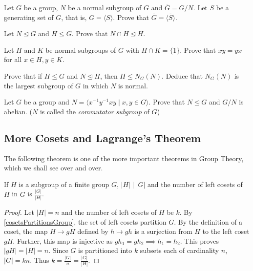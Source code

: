 \begin{exercise}
    Let $G$ be a group, $N$ be a normal subgroup of $G$ and $\overline G=G/N$. Let $S$ be a generating set of $G$, that is, $G=\langle S\rangle$. Prove that $\overline G=\langle\overline S\rangle$.
\end{exercise}

\begin{exercise}
    Let $N\unlhd G$ and $H\leq G$. Prove that $N\cap H\unlhd H$.
\end{exercise}

\begin{exercise}
    Let $H$ and $K$ be normal subgroups of $G$ with $H\cap K=\{1\}$. Prove that $xy=yx$ for all $x\in H, y\in K$.
\end{exercise}

\begin{exercise}
    Prove that if $H\leq G$ and $N\unlhd H$, then $H\leq N_G(N)$. Deduce that $N_G(N)$ is the largest subgroup of $G$ in which $N$ is normal.
\end{exercise}

\begin{exercise}
    Let $G$ be a group and $N=\langle x^{-1}y^{-1}xy\mid x,y\in G\rangle$. Prove that $N\unlhd G$ and $G/N$ is abelian. ($N$ is called the \textit{commutator subgroup} of $G$)
\end{exercise}

\subsection{More Cosets and Lagrange's Theorem}

The following theorem is one of the more important theorems in Group Theory, which we shall see over and over.

\begin{theorem}
\label{LagrangesTheorem}
    If $H$ is a subgroup of a finite group $G$, $|H|\mid |G|$ and the number of left cosets of $H$ in $G$ is $\frac{|G|}{|H|}$.
\end{theorem}
\begin{proof}
    Let $|H|=n$ and the number of left cosets of $H$ be $k$. By \ref{cosetsPartitionsGroup}, the set of left cosets partition $G$. By the definition of a coset, the map $H\to gH$ defined by $h\mapsto gh$ is a surjection from $H$ to the left coset $gH$. Further, this map is injective as $gh_1=gh_2\implies h_1=h_2$. This proves $|gH|=|H|=n$. Since $G$ is partitioned into $k$ subsets each of cardinality $n$, $|G|=kn$. Thus $k=\frac{|G|}{n}=\frac{|G|}{|H|}$.
\end{proof}

